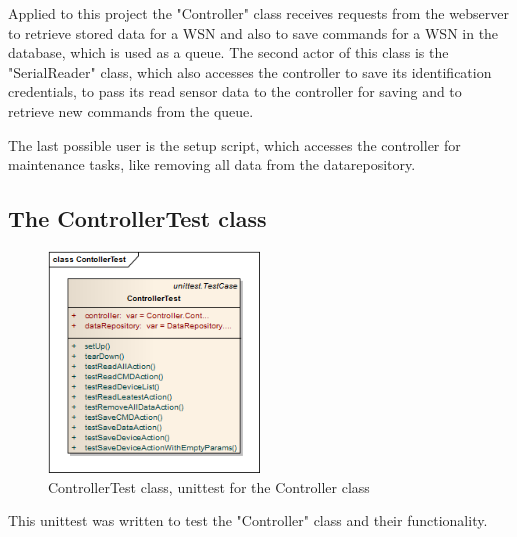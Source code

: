 Applied to this project the "Controller" class receives requests from the webserver to retrieve stored data for a WSN and also to save commands for a WSN in the database, which is used as a queue. The second actor of this class is the "SerialReader" class, which also accesses the controller to save its identification credentials, to pass its read sensor data to the controller for saving and to retrieve new commands from the queue.

The last possible user is the setup script, which accesses the controller for maintenance tasks, like removing all data from the datarepository.



\newpage
\subsection{The ControllerTest class}
\begin{figure}[H]
   \centering
   \includegraphics[width=0.5\textwidth]{pic/ControllerTest.png}%
   \caption{ControllerTest class, unittest for the Controller class}
   \label{ControllerTestpic}%
\end{figure}

This unittest was written to test the "Controller" class and their functionality. 

\newpage
